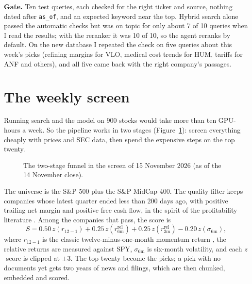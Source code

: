 \documentclass[11pt,a4paper]{article}
\newcommand{\code}[1]{\texttt{#1}}
\begin{document}
\textbf{Gate.} Ten test queries, each checked for the right ticker and source, nothing dated after
\code{as\_of}, and an expected keyword near the top. Hybrid search alone passed the automatic checks
but was on topic for only about 7 of 10 queries when I read the results; with the reranker it was 10 of
10, so the agent reranks by default. On the new database I repeated the check on five queries about this
week's picks (refining margins for VLO, medical cost trends for HUM, tariffs for ANF and others), and all
five came back with the right company's passages.

\section{The weekly screen}

Running search and the model on 900 stocks would take more than ten GPU-hours a week. So the pipeline
works in two stages (Figure~\ref{fig:funnel}): screen everything cheaply with prices and SEC data, then
spend the expensive steps on the top twenty.

\begin{figure}[htbp]
\centering
{}
\caption{The two-stage funnel in the screen of 15 November 2026 (as of the 14 November close).}
\label{fig:funnel}
\end{figure}

The universe is the S\&P 500 plus the S\&P MidCap 400. The quality filter keeps companies whose latest
quarter ended less than 200 days ago, with positive trailing net margin and positive free cash flow, in
the spirit of the profitability literature \cite{novymarx2013other}. Among the companies that pass, the
score is
\begin{equation}
  S = 0.50\, z(r_{12-1}) + 0.25\, z(r^{\text{rel}}_{6\text{m}}) + 0.25\, z(r^{\text{rel}}_{3\text{m}}) - 0.20\, z(\sigma_{6\text{m}}),
\end{equation}
where $r_{12-1}$ is the classic twelve-minus-one-month momentum return \cite{jegadeesh1993returns},
the relative returns are measured against SPY, $\sigma_{6\text{m}}$ is six-month volatility, and each
$z$-score is clipped at $\pm 3$. The top twenty become the picks; a pick with no documents yet gets two
years of news and filings, which are then chunked, embedded and scored.
\end{document}

